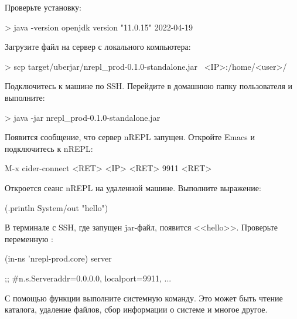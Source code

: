 Проверьте установку:

\begin{english}
  \begin{bash}
> java -version
openjdk version "11.0.15" 2022-04-19
  \end{bash}
\end{english}

Загрузите файл на сервер с локального компьютера:

\begin{english}
  \begin{bash}
> scp target/uberjar/nrepl_prod-0.1.0-standalone.jar \
      <IP>:/home/<user>/
  \end{bash}
\end{english}

Подключитесь к машине по SSH. Перейдите в домашнюю папку пользователя и выполните:

\begin{english}
  \begin{bash}
> java -jar nrepl_prod-0.1.0-standalone.jar
  \end{bash}
\end{english}

Появится сообщение, что сервер nREPL запущен. Откройте Emacs и подключитесь к nREPL:

\begin{english}
  \begin{text}
M-x cider-connect <RET> <IP> <RET> 9911 <RET>
  \end{text}
\end{english}

Откроется сеанс nREPL на удаленной машине. Выполните выражение:

\begin{english}
  \begin{clojure}
(.println System/out "hello")
  \end{clojure}
\end{english}

В терминале с SSH, где запущен jar-файл, появится <<hello>>. Проверьте переменную :

\begin{english}
  \begin{clojure}
(in-ns 'nrepl-prod.core)
server

;; #n.s.Server{addr=0.0.0.0, localport=9911, ...}
  \end{clojure}
\end{english}


С помощью функции  выполните системную команду. Это может быть чтение каталога, удаление файлов, сбор информации о системе и многое другое.

